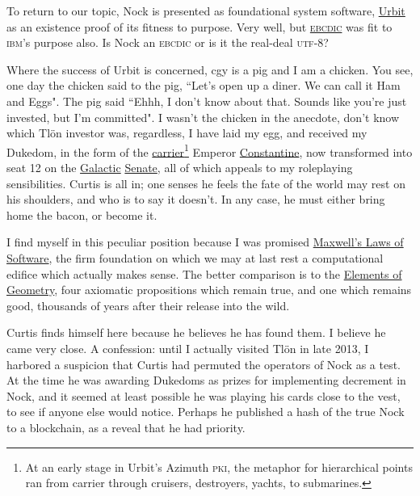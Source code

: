 \documentclass[twoside]{article}
\begin{document}
To return to our topic, Nock is presented as foundational system software, \href{https://urbit.org}{Urbit} as an existence proof of its fitness to purpose. Very well, but \href{https://en.wikipedia.org/wiki/EBCDIC}{\textsc{ebcdic}} was fit to \textsc{ibm}'s purpose also. Is Nock an \textsc{ebcdic} or is it the real-deal \textsc{utf}-8?

Where the success of Urbit is concerned, cgy is a pig and I am a chicken. You see, one day the chicken said to the pig, ``Let's open up a diner. We can call it Ham and Eggs". The pig said ``Ehhh, I don't know about that. Sounds like you're just invested, but I'm committed". I wasn't the chicken in the anecdote, don't know which Tlön investor was, regardless, I have laid my egg, and received my Dukedom, in the form of the \href{https://en.wikipedia.org/wiki/Aircraft_carrier}{carrier}\footnote{At an early stage in Urbit's Azimuth \textsc{pki}, the metaphor for hierarchical points ran from carrier through cruisers, destroyers, yachts, to submarines.} Emperor \href{https://en.wikipedia.org/wiki/Constantine_(disambiguation)}{Constantine}, now transformed into seat 12 on the \href{https://urbit.org/~~/posts/constitution/}{Galactic} \href{https://en.wikipedia.org/wiki/Roman_Senate}{Senate}, all of which appeals to my roleplaying sensibilities. Curtis is all in; one senses he feels the fate of the world may rest on his shoulders, and who is to say it doesn't. In any case, he must either bring home the bacon, or become it.

I find myself in this peculiar position because I was promised \href{https://moronlab.blogspot.com/}{Maxwell's Laws of Software}, the firm foundation on which we may at last rest a computational edifice which actually makes sense. The better comparison is to the \href{https://en.wikipedia.org/wiki/Euclid%27s_Elements}{Elements of Geometry}, four axiomatic propositions which remain true, and one which remains good, thousands of years after their release into the wild.

Curtis finds himself here because he believes he has found them. I believe he came very close. A confession: until I actually visited Tlön in late 2013, I harbored a suspicion that Curtis had permuted the operators of Nock as a test. At the time he was awarding Dukedoms as prizes for implementing decrement in Nock, and it seemed at least possible he was playing his cards close to the vest, to see if anyone else would notice. Perhaps he published a hash of the true Nock to a blockchain, as a reveal that he had priority.
\end{document}
